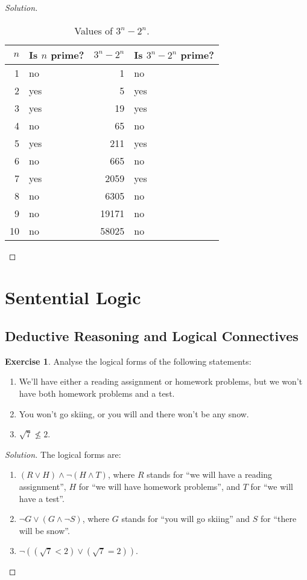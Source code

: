 \documentclass[headings=standardclasses]{scrartcl}
\theoremstyle{definition}
\newtheorem{exercise}{Exercise}[subsection]
\newenvironment{solution}{\begin{proof}[Solution]}{\end{proof}}
\begin{document}
\begin{solution}
  \begin{table}[H]
    \centering
    \begin{tabular}{rlrl}
      \toprule
      \(n\) & Is \(n\) prime? & \(3^n - 2^n\) & Is \(3^n - 2^n\) prime? \\
      \midrule
      1 & no & 1 & no \\
      2 & yes & 5 & yes \\
      3 & yes & 19 & yes \\
      4 & no & 65 & no \\
      5 & yes & 211 & yes \\
      6 & no & 665 & no \\
      7 & yes & 2059 & yes \\
      8 & no & 6305 & no \\
      9 & no & 19171 & no \\
      10 & no & 58025 & no \\
      \bottomrule
    \end{tabular}
    \caption{Values of \(3^n - 2^n\).}\label{table:conjecture_2}
  \end{table}
\end{solution}

\section{Sentential Logic}

\subsection{Deductive Reasoning and Logical Connectives}

\begin{exercise}
  Analyse the logical forms of the following statements:
  \begin{enumerate}
      \item We'll have either a reading assignment or homework problems, but we
            won't have both homework problems and a test.
      \item You won't go skiing, or you will and there won't be any snow.
      \item \(\sqrt{7} ≰  2\).
  \end{enumerate}
\end{exercise}

\begin{solution}
  The logical forms are:
  \begin{enumerate}
    \item \((R \lor H) \land \lnot (H \land T)\), where \(R\) stands for
          \enquote{we will have a reading assignment}, \(H\) for \enquote{we
          will have homework problems}, and \(T\) for \enquote{we will have a
          test}.
    \item \(\lnot G \lor (G \land \lnot S)\), where \(G\) stands for
          \enquote{you will go skiing} and \(S\) for \enquote{there will be
          snow}.
    \item \(\lnot ((\sqrt{7} < 2) \lor (\sqrt{7} = 2))\). \qedhere
  \end{enumerate}
\end{solution}
\end{document}
